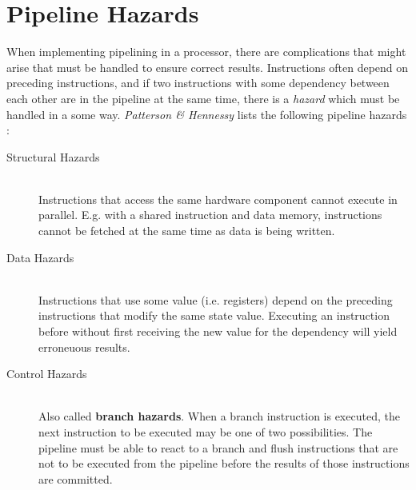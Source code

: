 \section{Pipeline Hazards}
When implementing pipelining in a processor,
there are complications that might arise that must be handled to ensure correct results.
Instructions often depend on preceding instructions,
and if two instructions with some dependency between each other are in the pipeline at the same time,
there is a \textit{hazard} which must be handled in a some way.
\textit{Patterson \& Hennessy} lists the following pipeline hazards
\cite[Chapter 4.5]{bib:patt-henn}:

\begin{description}
\item[Structural Hazards] \hfill \\
    Instructions that access the same hardware component cannot execute in parallel.
    E.g. with a shared instruction and data memory,
    instructions cannot be fetched at the same time as data is being written.
\item[Data Hazards] \hfill \\
    Instructions that use some value (i.e. registers) depend on the preceding instructions that modify the same state value.
    Executing an instruction before without first receiving the new value for the dependency will yield erroneuous results.
\item[Control Hazards] \hfill \\
    Also called \textbf{branch hazards}.
    When a branch instruction is executed,
    the next instruction to be executed may be one of two possibilities.
    The pipeline must be able to react to a branch and flush instructions that are not to be executed from the pipeline before the results of those instructions are committed.
\end{description}

